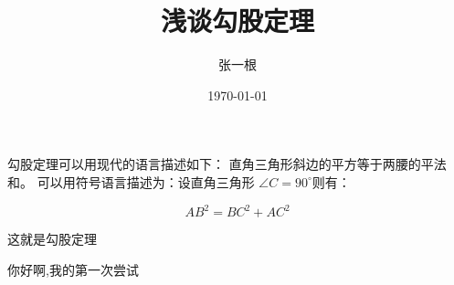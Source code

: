 \documentclass{article}
\title{\heiti 浅谈勾股定理}
\author{\kaishu 张一根}
\date{\today}
\newcommand\degree{^\circ}
\begin{document}
    勾股定理可以用现代的语言描述如下：
    直角三角形斜边的平方等于两腰的平法和。
    可以用符号语言描述为：设直角三角形 
    $\angle C=90\degree $则有：

    $$ 
        AB^2 = BC^2 + AC^2 
    $$

    这就是勾股定理

    你好啊,我的第一次尝试
    
\end{document}
